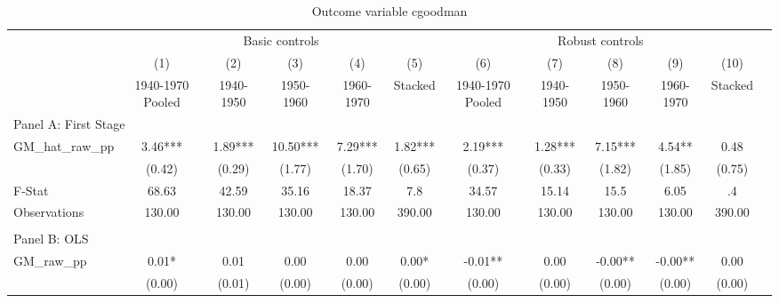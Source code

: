  \begin{table}[htbp]\centering {} \begin{threeparttable} \caption{Outcome variable cgoodman } \begin{tabular}{l*{11}{c}} \toprule
          &\multicolumn{5}{c}{Basic controls}                                   &\multicolumn{5}{c}{Robust controls}                                  \\\cmidrule(lr){2-6}\cmidrule(lr){7-11}
          &\multicolumn{1}{c}{(1)}&\multicolumn{1}{c}{(2)}&\multicolumn{1}{c}{(3)}&\multicolumn{1}{c}{(4)}&\multicolumn{1}{c}{(5)}&\multicolumn{1}{c}{(6)}&\multicolumn{1}{c}{(7)}&\multicolumn{1}{c}{(8)}&\multicolumn{1}{c}{(9)}&\multicolumn{1}{c}{(10)}\\
          &\multicolumn{1}{c}{1940-1970 Pooled}&\multicolumn{1}{c}{1940-1950}&\multicolumn{1}{c}{1950-1960}&\multicolumn{1}{c}{1960-1970}&\multicolumn{1}{c}{Stacked}&\multicolumn{1}{c}{1940-1970 Pooled}&\multicolumn{1}{c}{1940-1950}&\multicolumn{1}{c}{1950-1960}&\multicolumn{1}{c}{1960-1970}&\multicolumn{1}{c}{Stacked}\\
\cmidrule(lr){1-11}
\multicolumn{10}{l}{Panel A: First Stage}\\
\cmidrule(lr){1-11}
GM\_hat\_raw\_pp&      3.46***&      1.89***&     10.50***&      7.29***&      1.82***&      2.19***&      1.28***&      7.15***&      4.54** &      0.48   \\
          &    (0.42)   &    (0.29)   &    (1.77)   &    (1.70)   &    (0.65)   &    (0.37)   &    (0.33)   &    (1.82)   &    (1.85)   &    (0.75)   \\
\midrule
F-Stat    &     68.63   &     42.59   &     35.16   &     18.37   &       7.8   &     34.57   &     15.14   &      15.5   &      6.05   &        .4   \\
Observations&    130.00   &    130.00   &    130.00   &    130.00   &    390.00   &    130.00   &    130.00   &    130.00   &    130.00   &    390.00   \\
\cmidrule[\heavyrulewidth](lr){1-11} \\ \cmidrule[\heavyrulewidth](lr){1-11}
\multicolumn{10}{l}{Panel B: OLS}\\
\cmidrule(lr){1-11}
GM\_raw\_pp &      0.01*  &      0.01   &      0.00   &      0.00   &      0.00*  &     -0.01** &      0.00   &     -0.00** &     -0.00** &      0.00   \\
          &    (0.00)   &    (0.01)   &    (0.00)   &    (0.00)   &    (0.00)   &    (0.00)   &    (0.00)   &    (0.00)   &    (0.00)   &    (0.00)   \\

\end{tabular}
\end{threeparttable}
\end{table}

